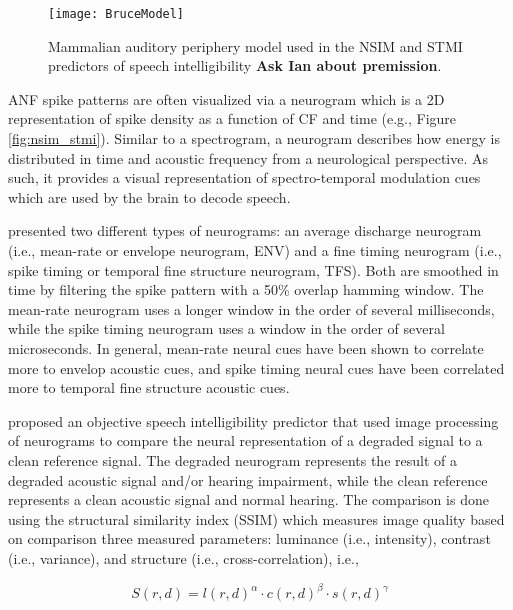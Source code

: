 \begin{figure}[H]
	\centering
	\texttt{[image: BruceModel]}
	\caption[Schematic for \cite{bruce2018phenomenological} auditory periphery model]{Mammalian auditory periphery model used in the NSIM and STMI predictors of speech intelligibility \citep{bruce2018phenomenological}  \textbf{Ask Ian about premission}.}
	\label{fig:bruce_model}
\end{figure}

ANF spike patterns are often visualized via a neurogram which is a 2D representation of spike density as a function of CF and time (e.g., Figure \ref{fig:nsim_stmi}). Similar to a spectrogram, a neurogram describes how energy is distributed in time and acoustic frequency from a neurological perspective. As such, it provides a visual representation of spectro-temporal modulation cues which are used by the brain to decode speech.


\cite{hines2010speech} presented two different types of neurograms: an average discharge neurogram (i.e., mean-rate or envelope neurogram, ENV) and a fine timing neurogram (i.e., spike timing or temporal fine structure neurogram, TFS). Both are smoothed in time by filtering the spike pattern with a 50\% overlap hamming window. The mean-rate neurogram uses a longer window in the order of several milliseconds, while the spike timing neurogram uses a window in the order of several microseconds. In general, mean-rate neural cues have been shown to correlate more to envelop acoustic cues, and spike timing neural cues have been correlated more to temporal fine structure acoustic cues. 

\cite{hines2010speech} proposed an objective speech intelligibility predictor that used image processing of neurograms to compare the neural representation of a degraded signal to a clean reference signal. The degraded neurogram represents the result of a degraded acoustic signal and/or hearing impairment, while the clean reference represents a clean acoustic signal and normal hearing. The comparison is done using the structural similarity index (SSIM) which measures image quality based on comparison three measured parameters: luminance (i.e., intensity), contrast (i.e., variance), and structure (i.e., cross-correlation), i.e.,

\begin{equation}
	S(r,d)=l(r,d)^\alpha \cdot c(r,d)^\beta \cdot s(r,d)^\gamma \label{eq:SSIM}
\end{equation}

